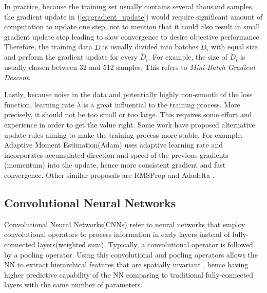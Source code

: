 In practice, because the training set usually contains several thousand samples, the gradient update in  (\ref{eq:gradient_update}) would require significant amount of computation to update one step, not to mention that it could also result in small gradient update step leading to slow convergence to desire objective performance. Therefore, the training data $D$ is usually divided into batches  $\widetilde{D}_i$  with equal size and perform the gradient update for every $\widetilde{D}_i$. For example, the size of $\widetilde{D}_i$ is usually chosen between 32 and 512 samples. This refers to \textit{Mini-Batch Gradient Descent}.

Lastly, because noise in the data and potentially highly non-smooth of the loss function, learning rate $\lambda$ is a great influential to the training process. More precisely, it should not be too small or too large. This requires some effort and experience in order to get the value right. Some work have proposed alternative update rules aiming to make the training process more stable. For example,  Adaptive Moment Estimation(Adam)\cite{KingmaAdamMethodStochastic2014}  uses adaptive learning rate  and incorporates accumulated direction and speed of the previous gradients (momentum) into the update, hence more consistent gradient and fast convergence. Other similar proposals are RMSProp \cite{TielemanLectureRmsPropDivide2012} and Adadelta \cite{ZeilerADADELTAAdaptiveLearning2012}.


\subsection{Convolutional Neural Networks} \label{sec:conv}
Convolutional Neural Networks(CNNs) refer to neural networks that employ convolutional operators to process information in early layers instead of fully-connected layers(weighted sum). Typically, a convolutional operator is followed by a pooling operator. Using this convolutional and pooling operators allows the NN to extract hierarchical features that are spatially invariant \cite{ZeilerVisualizingUnderstandingConvolutional2013}, hence having higher predictive capability of the NN comparing to traditional fully-connected layers with the same number of parameters.


